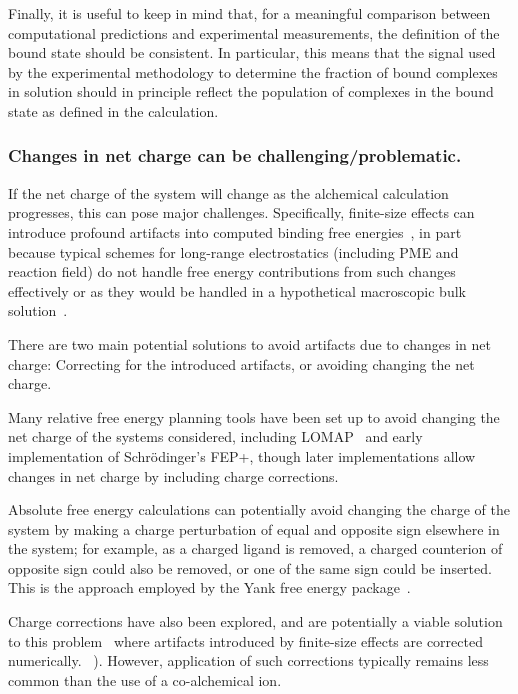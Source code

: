 \documentclass[9pt,bestpractices]{livecoms}
\begin{document}
Finally, it is useful to keep in mind that, for a meaningful comparison between computational predictions and experimental measurements, the definition of the bound state should be consistent.
In particular, this means that the signal used by the experimental methodology to determine the fraction of bound complexes in solution should in principle reflect the population of complexes in the bound state as defined in the calculation.

\subsubsection*{Changes in net charge can be challenging/problematic.}

If the net charge of the system will change as the alchemical calculation progresses, this can pose major challenges.
Specifically, finite-size effects can introduce profound artifacts into computed binding free energies~\cite{}, in part because typical schemes for long-range electrostatics (including PME and reaction field) do not handle free energy contributions from such changes effectively or as they would be handled in a hypothetical macroscopic bulk solution~\cite{}.

There are two main potential solutions to avoid artifacts due to changes in net charge: Correcting for the introduced artifacts, or avoiding changing the net charge.

Many relative free energy planning tools have been set up to avoid changing the net charge of the systems considered, including LOMAP~\cite{} and early implementation of Schr\"{o}dinger's FEP+, though later implementations allow changes in net charge by including charge corrections.

Absolute free energy calculations can potentially avoid changing the charge of the system by making a charge perturbation of equal and opposite sign elsewhere in the system; for example, as a charged ligand is removed, a charged counterion of opposite sign could also be removed, or one of the same sign could be inserted.
This is the approach employed by the Yank free energy package~\cite{wang2013identifying}.

Charge corrections have also been explored, and are potentially a viable solution to this problem~\cite{} where artifacts introduced by finite-size effects are corrected numerically.
~\cite{chen2018accurate}). However, application of such corrections typically remains less common than the use of a co-alchemical ion.
\end{document}
